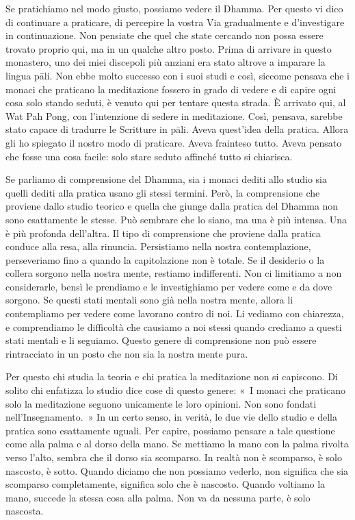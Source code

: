 Se pratichiamo nel modo giusto, possiamo vedere il Dhamma. Per questo vi
dico di continuare a praticare, di percepire la vostra Via gradualmente
e d'investigare in continuazione. Non pensiate che quel che state
cercando non possa essere trovato proprio qui, ma in un qualche altro
posto. Prima di arrivare in questo monastero, uno dei miei discepoli più
anziani era stato altrove a imparare la lingua pāli. Non ebbe molto
successo con i suoi studi e così, siccome pensava che i monaci che
praticano la meditazione fossero in grado di vedere e di capire ogni
cosa solo stando seduti, è venuto qui per tentare questa strada. È
arrivato qui, al Wat Pah Pong, con l'intenzione di sedere in
meditazione. Così, pensava, sarebbe stato capace di tradurre le
Scritture in pāli. Aveva quest'idea della pratica. Allora gli ho
spiegato il nostro modo di praticare. Aveva frainteso tutto. Aveva
pensato che fosse una cosa facile: solo stare seduto affinché tutto si
chiarisca.

Se parliamo di comprensione del Dhamma, sia i monaci dediti allo studio
sia quelli dediti alla pratica usano gli stessi termini. Però, la
comprensione che proviene dallo studio teorico e quella che giunge dalla
pratica del Dhamma non sono esattamente le stesse. Può sembrare che lo
siano, ma una è più intensa. Una è più profonda dell'altra. Il tipo di
comprensione che proviene dalla pratica conduce alla resa, alla
rinuncia. Persistiamo nella nostra contemplazione, perseveriamo fino a
quando la capitolazione non è totale. Se il desiderio o la collera
sorgono nella nostra mente, restiamo indifferenti. Non ci limitiamo a
non considerarle, bensì le prendiamo e le investighiamo per vedere come
e da dove sorgono. Se questi stati mentali sono già nella nostra mente,
allora li contempliamo per vedere come lavorano contro di noi. Li
vediamo con chiarezza, e comprendiamo le difficoltà che causiamo a noi
stessi quando crediamo a questi stati mentali e li seguiamo. Questo
genere di comprensione non può essere rintracciato in un posto che non
sia la nostra mente pura.

Per questo chi studia la teoria e chi pratica la meditazione non si
capiscono. Di solito chi enfatizza lo studio dice cose di questo genere:
«~I monaci che praticano solo la meditazione seguono unicamente le loro
opinioni. Non sono fondati nell'Insegnamento.~» In un certo senso, in
verità, le due vie dello studio e della pratica sono esattamente uguali.
Per capire, possiamo pensare a tale questione come alla palma e al dorso
della mano. Se mettiamo la mano con la palma rivolta verso l'alto,
sembra che il dorso sia scomparso. In realtà non è scomparso, è solo
nascosto, è sotto. Quando diciamo che non possiamo vederlo, non
significa che sia scomparso completamente, significa solo che è
nascosto. Quando voltiamo la mano, succede la stessa cosa alla palma.
Non va da nessuna parte, è solo nascosta.

